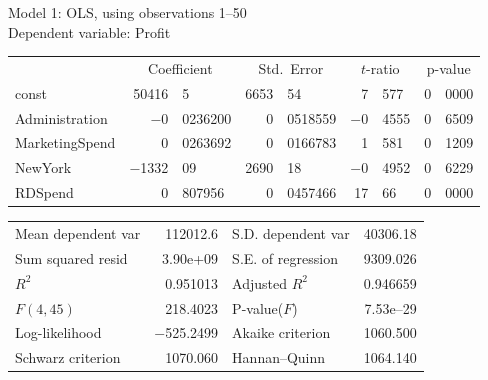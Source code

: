 \documentclass[11pt]{article}
\begin{document}
\thispagestyle{empty}

\begin{center}

Model 1: OLS, using observations 1--50\\
Dependent variable: Profit\\

\vspace{1em}

\begin{tabular}{lr@{.}lr@{.}lr@{.}lr@{.}l}
  &
 \multicolumn{2}{c}{Coefficient} &
  \multicolumn{2}{c}{Std.\ Error} &
   \multicolumn{2}{c}{$t$-ratio} &
    \multicolumn{2}{c}{p-value} \\[1ex]
const &
  50416&5 &
    6653&54 &
      7&577 &
        0&0000 \\
Administration &
  $-$0&0236200 &
    0&0518559 &
      $-$0&4555 &
        0&6509 \\
MarketingSpend &
  0&0263692 &
    0&0166783 &
      1&581 &
        0&1209 \\
NewYork &
  $-$1332&09 &
    2690&18 &
      $-$0&4952 &
        0&6229 \\
RDSpend &
  0&807956 &
    0&0457466 &
      17&66 &
        0&0000 \\
\end{tabular}

\vspace{1ex}
\begin{tabular}{lrlr}
Mean dependent var &  112012.6 & S.D. dependent var &  40306.18 \\
Sum squared resid &  3.90\textrm{e+09} & S.E. of regression &  9309.026 \\
$R^2$ &  0.951013 & Adjusted $R^2$ &  0.946659 \\
$F(4, 45)$ &  218.4023 & P-value($F$) &  7.53\textrm{e--29} \\
Log-likelihood & $-$525.2499 & Akaike criterion &  1060.500 \\
Schwarz criterion &  1070.060 & Hannan--Quinn &  1064.140 \\
\end{tabular}


\end{center}
\end{document}
